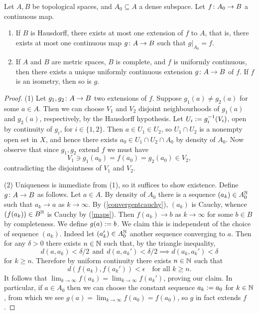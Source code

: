 \begin{lemma}
  Let $A,B$ be topological spaces, and $A_0 \subseteq A$ a dense
  subspace. Let $f \colon A_0 \to B$ a continuous map.
  \begin{enumerate}
  \item If $B$ is Hausdorff, there exists at most one extension of $f$
    to $A$, that is, there exists at most one continuous map $g \colon A
    \to B$ such that $g|_{A_0} = f$.
  \item If $A$ and $B$ are metric spaces, $B$ is complete, and $f$ is
    uniformly continuous, then there exists a unique uniformly
    continuous extension $g \colon A \to B$ of $f$. If $f$ is an isometry,
    then so is $g$.
  \end{enumerate}
\end{lemma}

\begin{proof}
  (1) Let $g_1,g_2 \colon A \to B$ two extensions of $f$. Suppose $g_1(a)
  \ne g_2(a)$ for some $a \in A$. Then we can choose $V_1$ and $V_2$
  disjoint neighbourhoods of $g_1(a)$ and $g_2(a)$, respectively, by
  the Hausdorff hypothesis. Let $U_i \mathrel{:=} g_i^{-1}(V_i)$, open by
  continuity of $g_i$, for $i \in \{1,2\}$. Then $a \in U_1 \in U_2$,
  so $U_1 \cap U_2$ is a nonempty open set in $X$, and hence there
  exists $a_0 \in U_1 \cap U_2 \cap A_0$ by density of $A_0$. Now
  observe that since $g_1,g_2$ extend $f$ we must have
  \[
  V_1 \ni g_1(a_0) = f(a_0) = g_2(a_0) \in V_2,
  \]
  contradicting the disjointness of $V_1$ and $V_2$.

  (2) Uniqueness is immediate from (1), so it suffices to show
  existence. Define $g \colon A \to B$ as follows. Let $a \in A$. By
  density of $A_0$ there is a sequence $(a_k) \in A_0^{\mathbb{N}}$ such that
  $a_k \to a$ as $k \to \infty$. By (\ref{convergentcauchy}), $(a_k)$
  is Cauchy, whence $(f(a_k)) \in B^{\mathbb{N}}$ is Cauchy by
  (\ref{maps}). Then $f(a_k) \to b$ as $k \to \infty$ for some $b \in
  B$ by completeness. We define $g(a) \mathrel{:=} b$. We claim this is
  independent of the choice of sequence $(a_k)$. Indeed let $(a_k')
  \in A_0^{\mathbb{N}}$ another sequence converging to $a$. Then for any $\delta
  > 0$ there exists $n \in \mathbb{N}$ such that, by the triangle inequality,
  \[
  d(a,a_k) < \delta/2\ \ \text{and}\ \ d(a,a_k') < \delta/2 \implies
  d(a_k,a_k') < \delta
  \]
  for $k \ge n$. Therefore by uniform continuity there exists $n \in
  \mathbb{N}$ such that
  \[
  d(f(a_k),f(a_k')) < \epsilon \quad\text{for all }k \ge n.
  \]
  It follows that $\lim_{k \to \infty} f(a_k) = \lim_{k \to \infty}
  f(a_k')$, proving our claim. In particular, if $a \in A_0$ then we
  can choose the constant sequence $a_k \mathrel{:=} a_0$ for $k \in \mathbb{N}$,
  from which we see $g(a) = \lim_{k \to \infty} f(a_0) = f(a_0)$, so
  $g$ in fact extends $f$.


\end{proof}
